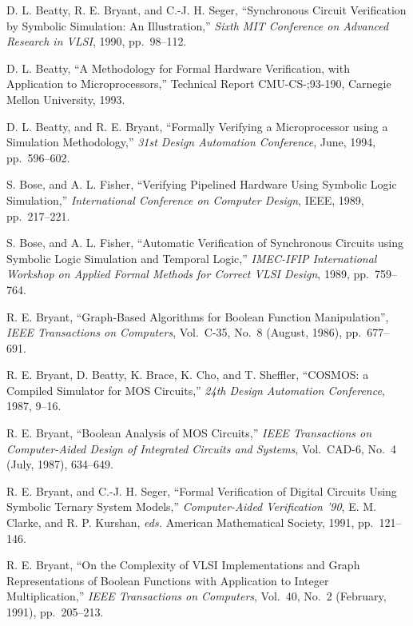 \begin{thebibliography}{99}

D. L. Beatty, R. E. Bryant, and C.-J. H. Seger,
``Synchronous Circuit Verification by Symbolic Simulation: An Illustration,''
{\it Sixth MIT Conference on Advanced Research in VLSI},
1990, pp.~98--112.

D. L. Beatty, ``A Methodology for Formal Hardware Verification, with
Application to Microprocessors,'' Technical Report CMU-CS-;93-190,
Carnegie Mellon University, 1993.

D. L. Beatty, and R. E. Bryant,
``Formally Verifying a Microprocessor using a Simulation Methodology,''
{\em 31st Design Automation Conference},
June, 1994, pp.~596--602.


S. Bose, and A. L. Fisher,
``Verifying Pipelined Hardware Using Symbolic Logic Simulation,''
{\it International Conference on Computer Design},
IEEE, 1989, pp.~217--221.

S. Bose, and A. L. Fisher,
``Automatic Verification of Synchronous Circuits using Symbolic Logic
Simulation and Temporal Logic,''
{\it IMEC-IFIP International Workshop on Applied Formal Methods for Correct
VLSI Design}, 1989, pp.~759--764.

R. E. Bryant,
``Graph-Based Algorithms for Boolean Function Manipulation'',
 {\it IEEE Transactions on Computers}, Vol.\ C-35, No.\ 8 (August, 1986),
pp.~677--691.

R. E. Bryant, D. Beatty, K. Brace, K. Cho, and T. Sheffler,
``COSMOS: a Compiled Simulator for MOS Circuits,''
{\it 24th Design Automation Conference}, 1987,
9--16.

R. E. Bryant,
``Boolean Analysis of MOS Circuits,''
{\it IEEE Transactions on Computer-Aided Design of Integrated Circuits and
Systems},
Vol.~CAD-6, No.~4 (July, 1987), 634--649.

R. E. Bryant, and C.-J. H. Seger, ``Formal Verification of Digital
Circuits Using Symbolic Ternary System Models,'' {\it Computer-Aided
Verification '90}, E. M. Clarke, and R. P. Kurshan, {\em eds.}
American Mathematical Society, 1991, pp.~121--146.

R. E. Bryant,
``On the Complexity of VLSI Implementations and Graph Representations of
Boolean Functions with Application to Integer Multiplication,''
{\it IEEE Transactions on Computers}, Vol.~40, No.~2 (February, 1991),
pp.~205--213.


\end{thebibliography}
